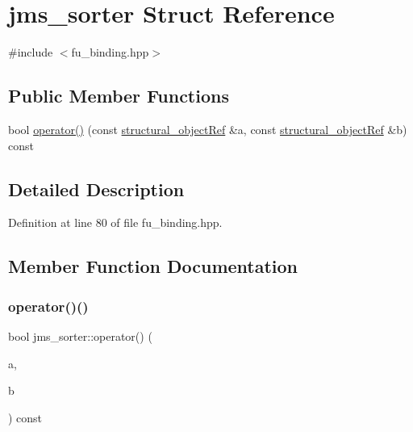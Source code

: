 \hypertarget{structjms__sorter}{}\section{jms\+\_\+sorter Struct Reference}
\label{structjms__sorter}


{\ttfamily \#include $<$fu\+\_\+binding.\+hpp$>$}

\subsection*{Public Member Functions}
\begin{DoxyCompactItemize}
\item 
bool \hyperlink{structjms__sorter_a7b39dc52725c7f0b3bb0a94b51bc319d}{operator()} (const \hyperlink{structural__objects_8hpp_a8ea5f8cc50ab8f4c31e2751074ff60b2}{structural\+\_\+object\+Ref} \&a, const \hyperlink{structural__objects_8hpp_a8ea5f8cc50ab8f4c31e2751074ff60b2}{structural\+\_\+object\+Ref} \&b) const
\end{DoxyCompactItemize}


\subsection{Detailed Description}


Definition at line 80 of file fu\+\_\+binding.\+hpp.



\subsection{Member Function Documentation}
\mbox{\label{structjms__sorter_a7b39dc52725c7f0b3bb0a94b51bc319d}} 
\subsubsection{\texorpdfstring{operator()()}{operator()()}}
{\footnotesize\ttfamily bool jms\+\_\+sorter\+::operator() (\begin{DoxyParamCaption}\item[{const \hyperlink{structural__objects_8hpp_a8ea5f8cc50ab8f4c31e2751074ff60b2}{structural\+\_\+object\+Ref} \&}]{a,  }\item[{const \hyperlink{structural__objects_8hpp_a8ea5f8cc50ab8f4c31e2751074ff60b2}{structural\+\_\+object\+Ref} \&}]{b }\end{DoxyParamCaption}) const}



